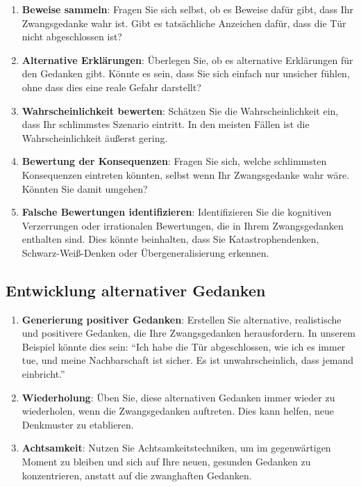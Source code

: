 \begin{enumerate}
  \item \textbf{Beweise sammeln}: Fragen Sie sich selbst, ob es Beweise dafür gibt, dass Ihr Zwangsgedanke wahr ist. Gibt es tatsächliche Anzeichen dafür, dass die Tür nicht abgeschlossen ist?
  
  \item \textbf{Alternative Erklärungen}: Überlegen Sie, ob es alternative Erklärungen für den Gedanken gibt. Könnte es sein, dass Sie sich einfach nur unsicher fühlen, ohne dass dies eine reale Gefahr darstellt?
  
  \item \textbf{Wahrscheinlichkeit bewerten}: Schätzen Sie die Wahrscheinlichkeit ein, dass Ihr schlimmstes Szenario eintritt. In den meisten Fällen ist die Wahrscheinlichkeit äußerst gering.
  
  \item \textbf{Bewertung der Konsequenzen}: Fragen Sie sich, welche schlimmsten Konsequenzen eintreten könnten, selbst wenn Ihr Zwangsgedanke wahr wäre. Könnten Sie damit umgehen?
  
  \item \textbf{Falsche Bewertungen identifizieren}: Identifizieren Sie die kognitiven Verzerrungen oder irrationalen Bewertungen, die in Ihrem Zwangsgedanken enthalten sind. Dies könnte beinhalten, dass Sie Katastrophendenken, Schwarz-Weiß-Denken oder Übergeneralisierung erkennen.
\end{enumerate}

\subsection{Entwicklung alternativer Gedanken}

\begin{enumerate}
  \item \textbf{Generierung positiver Gedanken}: Erstellen Sie alternative, realistische und positivere Gedanken, die Ihre Zwangsgedanken herausfordern. In unserem Beispiel könnte dies sein: \enquote{Ich habe die Tür abgeschlossen, wie ich es immer tue, und meine Nachbarschaft ist sicher. Es ist unwahrscheinlich, dass jemand einbricht.}
  
  \item \textbf{Wiederholung}: Üben Sie, diese alternativen Gedanken immer wieder zu wiederholen, wenn die Zwangsgedanken auftreten. Dies kann helfen, neue Denkmuster zu etablieren.
  
  \item \textbf{Achtsamkeit}: Nutzen Sie Achtsamkeitstechniken, um im gegenwärtigen Moment zu bleiben und sich auf Ihre neuen, gesunden Gedanken zu konzentrieren, anstatt auf die zwanghaften Gedanken.
\end{enumerate}

